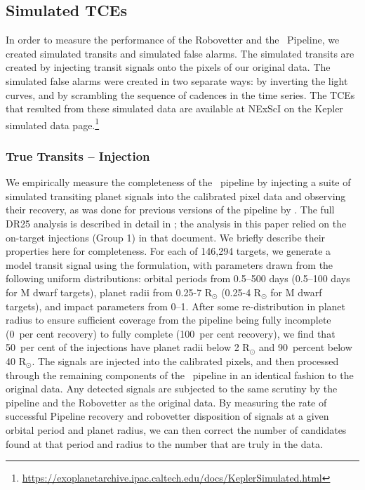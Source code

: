 \subsection{Simulated TCEs}
\label{s:simulated}
In order to measure the performance of the Robovetter and the \Kepler\ Pipeline, we created simulated transits and simulated false alarms. The simulated transits are created by injecting transit signals onto the pixels of our original data. The simulated false alarms were created in two separate ways: by inverting the light curves, and by scrambling the sequence of cadences in the time series. The TCEs that resulted from these simulated data are available at NExScI on the Kepler simulated data page.\footnote{\url{https://exoplanetarchive.ipac.caltech.edu/docs/KeplerSimulated.html}}


\subsubsection{True Transits -- Injection}
\label{injectsec}

We empirically measure the completeness of the \Kepler\ pipeline by injecting a suite of simulated transiting planet signals into the calibrated pixel data and observing their recovery, as was done for previous versions of the pipeline by \citep{Christiansen2013a,Christiansen2015,Christiansen2016}. The full DR25 analysis is described in detail in \citep{Christiansen2017}; the analysis in this paper relied on the on-target injections (Group 1) in that document. We briefly describe their properties here for completeness. For each of 146,294 targets, we generate a model transit signal using the \citet{Mandel2002} formulation, with parameters drawn from the following uniform distributions: orbital periods from 0.5--500 days (0.5--100 days for M dwarf targets), planet radii from 0.25-7 R$_{\odot}$ (0.25-4 R$_{\odot}$ for M dwarf targets), and impact parameters from 0--1. After some re-distribution in planet radius to ensure sufficient coverage from the pipeline being fully incomplete (0~per cent recovery) to fully complete (100~per cent recovery), we find that 50~per cent of the injections have planet radii below 2 R$_{\odot}$ and 90~percent below 40 R$_{\odot}$. The signals are injected into the calibrated pixels, and then processed through the remaining components of the \Kepler\ pipeline in an identical fashion to the original data. Any detected signals are subjected to the same scrutiny by the pipeline and the Robovetter as the original data. By measuring the rate of successful Pipeline recovery and robovetter disposition of signals at a given orbital period and planet radius, we can then correct the number of candidates found at that period and radius to the number that are truly in the data. %



